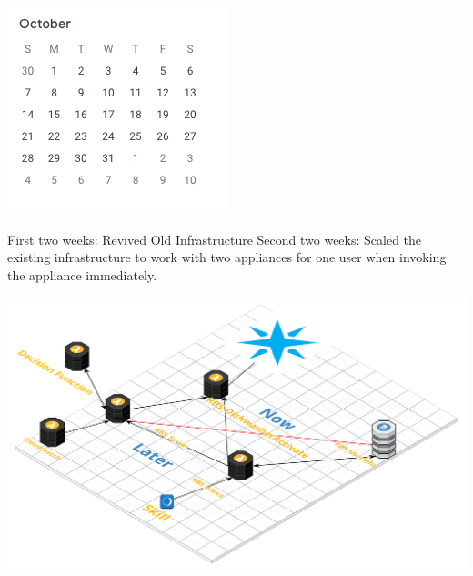 \documentclass{beamer}
\begin{document}
\begin{frame}
    \includegraphics[width=0.5\paperwidth,height=0.5\paperheight,keepaspectratio]{pictures/october}
    \begin{outline}
         First two weeks:
         Revived Old Infrastructure
         Second two weeks:
         Scaled the existing infrastructure to work with two appliances for one user
        when invoking the appliance immediately.
    \end{outline}
\end{frame}

\begin{frame}
    \includegraphics[width=\paperwidth,height=\paperheight,keepaspectratio]{pictures/architecture}
\end{frame}
\end{document}
